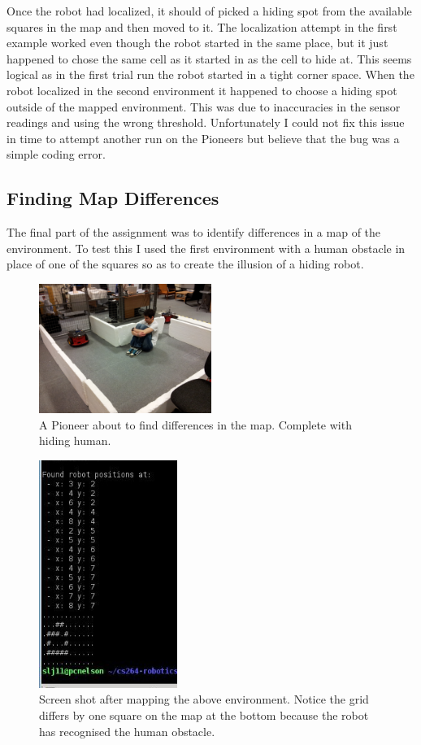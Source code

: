 \documentclass{article}
\begin{document}
Once the robot had localized, it should of picked a hiding spot from the available squares in the map and then moved to it. The localization attempt in the first example worked even though the robot started in the same place, but it just happened to chose the same cell as it started in as the cell to hide at. This seems logical as in the first trial run the robot started in a tight corner space. When the robot localized in the second environment it happened to choose a hiding spot outside of the mapped environment. This was due to inaccuracies in the sensor readings and using the wrong threshold. Unfortunately I could not fix this issue in time to attempt another run on the Pioneers but believe that the bug was a simple coding error.

\subsection{Finding Map Differences}
The final part of the assignment was to identify differences in a map of the environment. To test this I used the first environment with a human obstacle in place of one of the squares so as to create the illusion of a hiding robot.

\begin{figure}[H]
\centering
\includegraphics[width=0.5\textwidth]{img/robot_pics/20130416_135014.jpg}
\caption{A Pioneer about to find differences in the map. Complete with hiding human.}
\label{fig:robot-map-obstacle-image}
\end{figure}

\begin{figure}[H]
\centering
\includegraphics[width=0.4\textwidth]{img/robot_pics/seeker_example.jpg}
\caption{Screen shot after mapping the above environment. Notice the grid differs by one square on the map at the bottom because the robot has recognised the human obstacle.}
\label{fig:robot-map-obstacle}
\end{figure}
\end{document}
